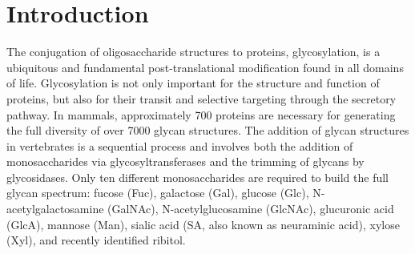 \clearpage

\section{Introduction}

The conjugation of oligosaccharide structures to proteins, glycosylation, is a ubiquitous and fundamental post-translational modification found in all domains of life. Glycosylation is not only important for the structure and function of proteins, but also for their transit and selective targeting through the secretory pathway\cite{dennis_adaptive_2009,haltiwanger_role_2004,hoseki_mechanism_2010,kollmann_mannose_2010,moremen_vertebrate_2012,rothman_coated_1980,varki_biological_1993}. In mammals, approximately 700 proteins are necessary for generating the full diversity of over 7000 glycan structures\cite{cummings_repertoire_2009,joshi_glycosyltransferase_2018,nairn_handbook_2009,nairn_regulation_2008,narimatsu_atlas_2019}. The addition of glycan structures in vertebrates is a sequential process and involves both the addition of monosaccharides via glycosyltransferases and the trimming of glycans by glycosidases\cite{lombard_carbohydrate-active_2014}. Only ten different monosaccharides are required to build the full glycan spectrum: fucose (Fuc), galactose (Gal), glucose (Glc), N-acetylgalactosamine (GalNAc), N-acetylglucosamine (GlcNAc), glucuronic acid (GlcA), mannose (Man), sialic acid (SA, also known as neuraminic acid), xylose (Xyl), and recently identified ribitol\cite{cummings_repertoire_2009,nairn_handbook_2009,nairn_regulation_2008,riemersma_human_2015}.


